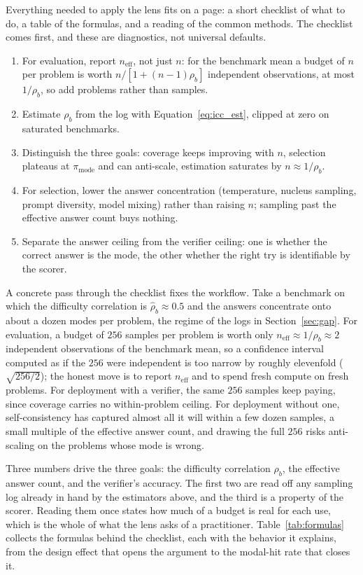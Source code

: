 \documentclass[11pt]{article}
\newcommand{\neff}{n_{\mathrm{eff}}}
\begin{document}
Everything needed to apply the lens fits on a page: a short checklist of what to do, a table of the formulas, and a reading of the common methods. The checklist comes first, and these are diagnostics, not universal defaults.
\begin{enumerate}
\item For evaluation, report $\neff$, not just $n$: for the benchmark mean a budget of $n$ per problem is worth $n/[1+(n-1)\rho_b]$ independent observations, at most $1/\rho_b$, so add problems rather than samples.
\item Estimate $\rho_b$ from the log with Equation~\eqref{eq:icc_est}, clipped at zero on saturated benchmarks.
\item Distinguish the three goals: coverage keeps improving with $n$, selection plateaus at $\pi_{\mathrm{mode}}$ and can anti-scale, estimation saturates by $n\approx1/\rho_b$.
\item For selection, lower the answer concentration (temperature, nucleus sampling, prompt diversity, model mixing) rather than raising $n$; sampling past the effective answer count buys nothing.
\item Separate the answer ceiling from the verifier ceiling: one is whether the correct answer is the mode, the other whether the right try is identifiable by the scorer.
\end{enumerate}

A concrete pass through the checklist fixes the workflow. Take a benchmark on which the difficulty correlation is $\hat\rho_b\approx0.5$ and the answers concentrate onto about a dozen modes per problem, the regime of the logs in Section~\ref{sec:gap}. For evaluation, a budget of $256$ samples per problem is worth only $\neff\approx1/\rho_b\approx2$ independent observations of the benchmark mean, so a confidence interval computed as if the $256$ were independent is too narrow by roughly elevenfold ($\sqrt{256/2}$); the honest move is to report $\neff$ and to spend fresh compute on fresh problems. For deployment with a verifier, the same $256$ samples keep paying, since coverage carries no within-problem ceiling. For deployment without one, self-consistency has captured almost all it will within a few dozen samples, a small multiple of the effective answer count, and drawing the full $256$ risks anti-scaling on the problems whose mode is wrong.

Three numbers drive the three goals: the difficulty correlation $\rho_b$, the effective answer count, and the verifier's accuracy. The first two are read off any sampling log already in hand by the estimators above, and the third is a property of the scorer. Reading them once states how much of a budget is real for each use, which is the whole of what the lens asks of a practitioner. Table~\ref{tab:formulas} collects the formulas behind the checklist, each with the behavior it explains, from the design effect that opens the argument to the modal-hit rate that closes it.
\end{document}
